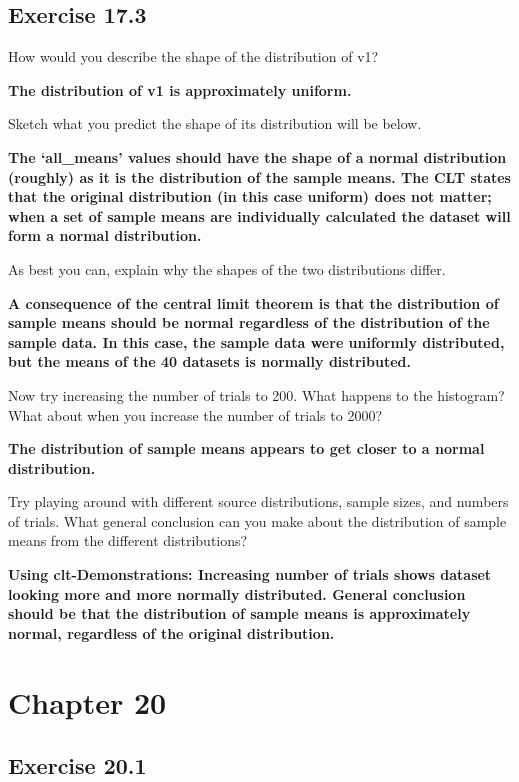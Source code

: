 \documentclass[
  openany]{krantz}
\begin{document}
\hypertarget{exercise-17.3}{%
\subsection{Exercise 17.3}\label{exercise-17.3}}

How would you describe the shape of the distribution of v1?

\textbf{The distribution of v1 is approximately uniform.}

Sketch what you predict the shape of its distribution will be below.

\textbf{The `all\_means' values should have the shape of a normal distribution (roughly) as it is the distribution of the sample means. The CLT states that the original distribution (in this case uniform) does not matter; when a set of sample means are individually calculated the dataset will form a normal distribution.}

As best you can, explain why the shapes of the two distributions differ.

\textbf{A consequence of the central limit theorem is that the distribution of sample means should be normal regardless of the distribution of the sample data. In this case, the sample data were uniformly distributed, but the means of the 40 datasets is normally distributed.}

Now try increasing the number of trials to 200. What happens to the histogram? What about when you increase the number of trials to 2000?

\textbf{The distribution of sample means appears to get closer to a normal distribution.}

Try playing around with different source distributions, sample sizes, and numbers of trials. What general conclusion can you make about the distribution of sample means from the different distributions?

\textbf{Using clt-Demonstrations: Increasing number of trials shows dataset looking more and more normally distributed. General conclusion should be that the distribution of sample means is approximately normal, regardless of the original distribution.}

\hypertarget{chapter-20}{%
\section{Chapter 20}\label{chapter-20}}

\hypertarget{exercise-20.1}{%
\subsection{Exercise 20.1}\label{exercise-20.1}}
\end{document}
